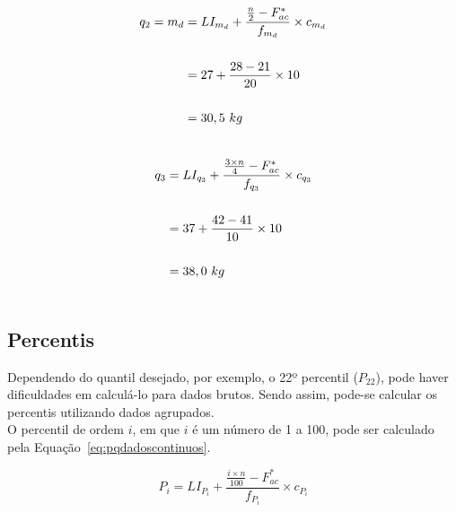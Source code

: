 \documentclass[11pt,fleqn]{book} %
\begin{document}
\begin{example}

\begin{ceqn}
\begin{align*}
\centering
q_2=m_d
&= \displaystyle LI_{m_d}+\frac{\frac{n}{2}-F_{ac}^*}{f_{m_d}} \times c_{m_d} \\ \\
&= \displaystyle 27+\frac{28-21}{20} \times 10 \\ \\
&= 30,5 \,\, kg\\ \\
\end{align*}
\end{ceqn}


\begin{ceqn}
\begin{align*}
\centering
q_3
&= \displaystyle LI_{q_3}+\frac{\frac{3 \times n}{4}-F_{ac}^*}{f_{q_3}} \times c_{q_3} \\ \\
&= \displaystyle 37+\frac{42-41}{10} \times 10 \\ \\
&= 38,0 \,\, kg\\ \\
\end{align*}
\end{ceqn}



\end{example}

\subsection{Percentis}

Dependendo do quantil desejado, por exemplo, o 22º percentil ($P_{22}$), pode haver dificuldades em calculá-lo para dados brutos. Sendo assim, pode-se calcular os percentis utilizando dados agrupados.\\

O percentil de ordem $i$, em que $i$ é um número de 1 a 100, pode ser calculado pela Equação~\ref{eq:pqdadoscontinuos}. \\

\begin{eBox}
\vspace{-0.5cm}
\begin{equation} \label{eq:pqdadoscontinuos}
	P_i=\displaystyle LI_{P_i}+\frac{\frac{i \times n}{100}-F_{ac}^*}{f_{P_i}} \times c_{P_i}
\end{equation}
\end{eBox}
\end{document}
